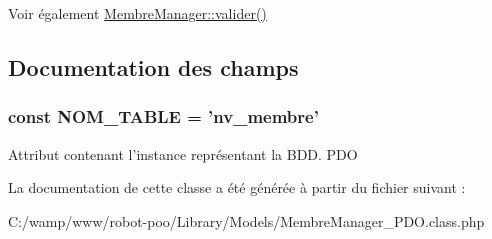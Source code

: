 \begin{DoxySeeAlso}{Voir également}
\hyperlink{class_library_1_1_models_1_1_membre_manager_aa6b82e38583e652b2506a45dce4b5480}{Membre\+Manager\+::valider()} 
\end{DoxySeeAlso}


\subsection{Documentation des champs}
\hypertarget{class_library_1_1_models_1_1_membre_manager___p_d_o_a243755033f10b0817aa9d990cc252817}{
\subsubsection[{N\+O\+M\+\_\+\+T\+A\+B\+L\+E}]{\setlength{\rightskip}{0pt plus 5cm}const N\+O\+M\+\_\+\+T\+A\+B\+L\+E = 'nv\+\_\+membre'}}\label{class_library_1_1_models_1_1_membre_manager___p_d_o_a243755033f10b0817aa9d990cc252817}
Attribut contenant l'instance représentant la B\+D\+D.  P\+D\+O 

La documentation de cette classe a été générée à partir du fichier suivant \+:\begin{DoxyCompactItemize}
\item 
C\+:/wamp/www/robot-\/poo/\+Library/\+Models/Membre\+Manager\+\_\+\+P\+D\+O.\+class.\+php\end{DoxyCompactItemize}
